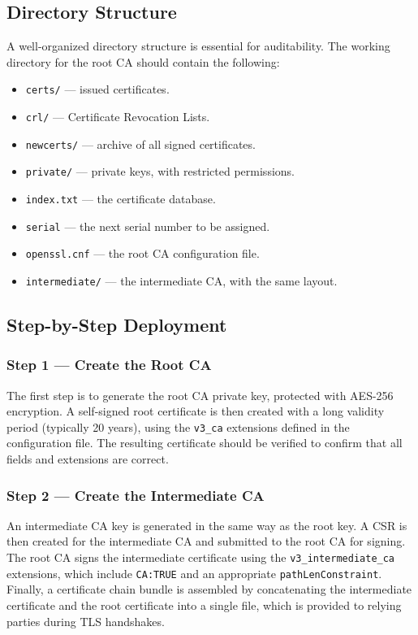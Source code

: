 \documentclass[10pt,twocolumn]{article}
\begin{document}
\subsection{Directory Structure}

A well-organized directory structure is essential for auditability. The
working directory for the root CA should contain the following:

\begin{itemize}
  \item \texttt{certs/} --- issued certificates.
  \item \texttt{crl/} --- Certificate Revocation Lists.
  \item \texttt{newcerts/} --- archive of all signed certificates.
  \item \texttt{private/} --- private keys, with restricted permissions.
  \item \texttt{index.txt} --- the certificate database.
  \item \texttt{serial} --- the next serial number to be assigned.
  \item \texttt{openssl.cnf} --- the root CA configuration file.
  \item \texttt{intermediate/} --- the intermediate CA, with the same layout.
\end{itemize}

\subsection{Step-by-Step Deployment}

\subsubsection{Step 1 --- Create the Root CA}

The first step is to generate the root CA private key, protected with
AES-256 encryption. A self-signed root certificate is then created with a
long validity period (typically 20 years), using the \texttt{v3\_ca}
extensions defined in the configuration file. The resulting certificate
should be verified to confirm that all fields and extensions are correct.

\subsubsection{Step 2 --- Create the Intermediate CA}

An intermediate CA key is generated in the same way as the root key. A CSR
is then created for the intermediate CA and submitted to the root CA for
signing. The root CA signs the intermediate certificate using the
\texttt{v3\_intermediate\_ca} extensions, which include
\texttt{CA:TRUE} and an appropriate \texttt{pathLenConstraint}. Finally,
a certificate chain bundle is assembled by concatenating the intermediate
certificate and the root certificate into a single file, which is provided
to relying parties during TLS handshakes.
\end{document}
